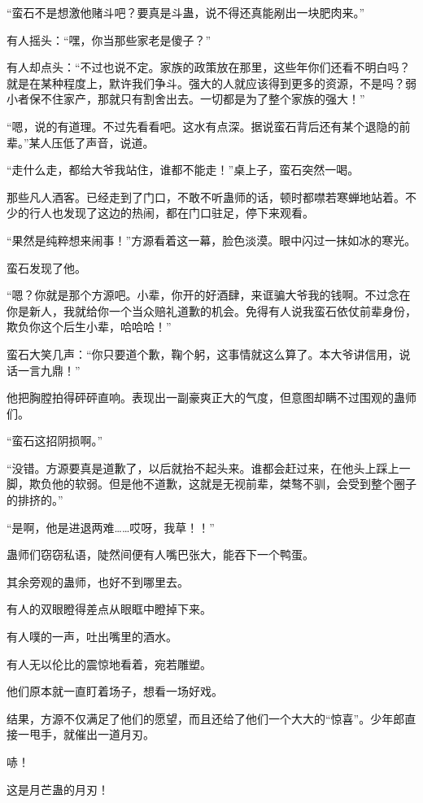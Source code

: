 \begin{this_body}
“蛮石不是想激他赌斗吧？要真是斗蛊，说不得还真能剐出一块肥肉来。”

有人摇头：“嘿，你当那些家老是傻子？”

有人却点头：“不过也说不定。家族的政策放在那里，这些年你们还看不明白吗？就是在某种程度上，默许我们争斗。强大的人就应该得到更多的资源，不是吗？弱小者保不住家产，那就只有割舍出去。一切都是为了整个家族的强大！”

“嗯，说的有道理。不过先看看吧。这水有点深。据说蛮石背后还有某个退隐的前辈。”某人压低了声音，说道。

“走什么走，都给大爷我站住，谁都不能走！”桌上子，蛮石突然一喝。

那些凡人酒客。已经走到了门口，不敢不听蛊师的话，顿时都噤若寒蝉地站着。不少的行人也发现了这边的热闹，都在门口驻足，停下来观看。

“果然是纯粹想来闹事！”方源看着这一幕，脸色淡漠。眼中闪过一抹如冰的寒光。

蛮石发现了他。

“嗯？你就是那个方源吧。小辈，你开的好酒肆，来诓骗大爷我的钱啊。不过念在你是新人，我就给你一个当众赔礼道歉的机会。免得有人说我蛮石依仗前辈身份，欺负你这个后生小辈，哈哈哈！”

蛮石大笑几声：“你只要道个歉，鞠个躬，这事情就这么算了。本大爷讲信用，说话一言九鼎！”

他把胸膛拍得砰砰直响。表现出一副豪爽正大的气度，但意图却瞒不过围观的蛊师们。

“蛮石这招阴损啊。”

“没错。方源要真是道歉了，以后就抬不起头来。谁都会赶过来，在他头上踩上一脚，欺负他的软弱。但是他不道歉，这就是无视前辈，桀骜不驯，会受到整个圈子的排挤的。”

“是啊，他是进退两难……哎呀，我草！！”

蛊师们窃窃私语，陡然间便有人嘴巴张大，能吞下一个鸭蛋。

其余旁观的蛊师，也好不到哪里去。

有人的双眼瞪得差点从眼眶中瞪掉下来。

有人噗的一声，吐出嘴里的酒水。

有人无以伦比的震惊地看着，宛若雕塑。

他们原本就一直盯着场子，想看一场好戏。

结果，方源不仅满足了他们的愿望，而且还给了他们一个大大的“惊喜”。少年郎直接一甩手，就催出一道月刃。

哧！

这是月芒蛊的月刃！


\end{this_body}
